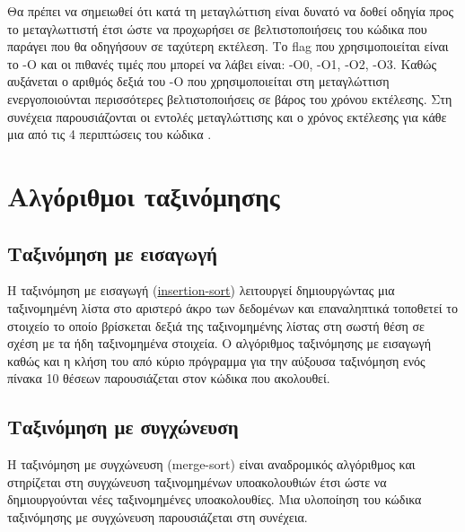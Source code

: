 Θα πρέπει να σημειωθεί ότι κατά τη μεταγλώττιση είναι δυνατό να δοθεί οδηγία προς το μεταγλωττιστή έτσι ώστε να προχωρήσει σε βελτιστοποιήσεις του κώδικα που παράγει που θα οδηγήσουν σε ταχύτερη εκτέλεση. Το flag που χρησιμοποιείται είναι το -Ο και οι πιθανές τιμές που μπορεί να λάβει είναι: -Ο0, -Ο1, -Ο2, -Ο3. Καθώς αυξάνεται ο αριθμός δεξιά του -Ο που χρησιμοποιείται στη μεταγλώττιση ενεργοποιούνται περισσότερες βελτιστοποιήσεις σε βάρος του χρόνου εκτέλεσης. Στη συνέχεια παρουσιάζονται οι εντολές μεταγλώττισης και ο χρόνος εκτέλεσης για κάθε μια από τις 4 περιπτώσεις του κώδικα .




\section{Αλγόριθμοι ταξινόμησης}
\subsection{Ταξινόμηση με εισαγωγή}
Η ταξινόμηση με εισαγωγή (\href{http://rosettacode.org/wiki/Sorting_algorithms/Insertion_sort}{insertion-sort}) λειτουργεί δημιουργώντας μια ταξινομημένη λίστα στο αριστερό άκρο των δεδομένων και επαναληπτικά τοποθετεί το στοιχείο το οποίο βρίσκεται δεξιά της ταξινομημένης λίστας στη σωστή θέση σε σχέση με τα ήδη ταξινομημένα στοιχεία. Ο αλγόριθμος ταξινόμησης με εισαγωγή καθώς και η κλήση του από κύριο πρόγραμμα για την αύξουσα ταξινόμηση ενός πίνακα 10 θέσεων παρουσιάζεται στον κώδικα που ακολουθεί.







\subsection{Ταξινόμηση με συγχώνευση}
Η ταξινόμηση με συγχώνευση (merge-sort) είναι αναδρομικός αλγόριθμος και στηρίζεται στη συγχώνευση ταξινομημένων υποακολουθιών έτσι ώστε να δημιουργούνται νέες ταξινομημένες υποακολουθίες. Μια υλοποίηση του κώδικα ταξινόμησης με συγχώνευση παρουσιάζεται στη συνέχεια. 



